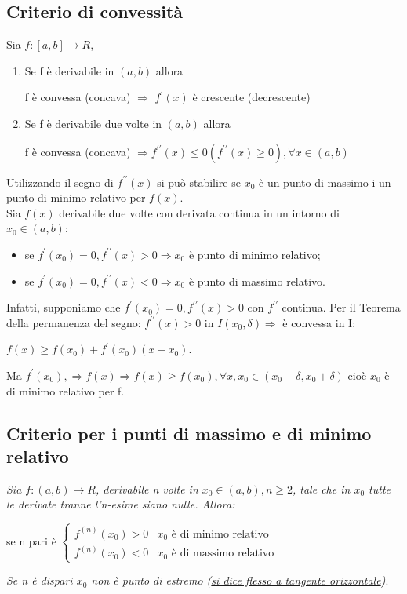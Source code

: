 \documentclass{book}
\begin{document}
\subsection{Criterio di convessità}
Sia $f:[a,b]\to R$,
\begin{enumerate}
	\item Se f è derivabile in $(a,b)$ allora
		\begin{center}
			f è convessa (concava) $\Rightarrow$ $f^\prime(x)$ è crescente
			(decrescente)
		\end{center}
	\item Se f è derivabile due volte in $(a,b)$ allora
		\begin{center}
			f è convessa (concava) $\Rightarrow f^{\prime\prime}(x)\leq
			0(f^{\prime\prime}(x)\geq 0), \forall x \in (a,b)$
		\end{center}
\end{enumerate}
Utilizzando il segno di $f^{\prime\prime}(x)$ si può stabilire se $x_0$ è un
punto di massimo i un punto di minimo relativo per $f(x)$.\\
Sia $f(x)$ derivabile due volte con derivata continua in un intorno di
$x_0\in(a,b)$:
\begin{itemize}
	\item se $f^{\prime}(x_0)=0, f^{\prime\prime}(x)>0\Rightarrow x_0$ è punto di minimo
relativo;
\item se $f^{\prime}(x_0)=0, f^{\prime\prime}(x)<0\Rightarrow x_0$ è punto di massimo
relativo.
\end{itemize}
Infatti, supponiamo che $f^{\prime}(x_0)=0, f^{\prime\prime}(x)>0$ con
$f^{\prime\prime}$ continua. Per il Teorema della permanenza del segno:
$f^{\prime\prime}(x)>0$ in $I(x_0,\delta)\Rightarrow$ è convessa in I:
\begin{center}
	$f(x)\geq f(x_0)+f^\prime(x_0)(x-x_0)$.
\end{center}
Ma $f^\prime (x_0), \Rightarrow f(x)\Rightarrow f(x) \geq f(x_0), \forall x,
x_0\in (x_0-\delta, x_0+\delta)$ cioè $x_0$ è di minimo relativo per f.
\subsection{Criterio per i punti di massimo e di minimo relativo}
\textit{Sia $f:(a,b)\to R$, derivabile n volte in $x_0\in (a,b), n\geq 2$, tale
che in $x_0$ tutte le derivate tranne l'n-esime siano nulle. Allora:}
\begin{center}
	se n pari è $\begin{cases}
		f^{(n)}(x_0)>0 & x_0\text{ è di minimo relativo}\\
		f^{(n)}(x_0)<0 & x_0\text{ è di massimo relativo}
	\end{cases}$
\end{center}
\textit{Se n è dispari $x_0$ non è punto di estremo (\underline{si dice flesso a tangente
orizzontale})}.
\end{document}
